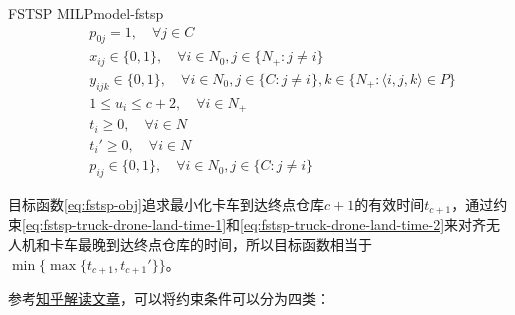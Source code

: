{\begin{model}{FSTSP MILP}{model-fstsp}
\begin{align}
    \quad & p_{0j} = 1, \quad \forall j \in C\label{eq:fstsp-drone-start-order}\\
    \quad & x_{ij} \in \{0, 1\}, \quad \forall i \in N_0, j \in \{N_{+}:j \neq i\}\label{eq:fstsp-x-bound}\\
    \quad & y_{ijk} \in \{0, 1\}, \quad \forall i \in N_0, j \in \{C:j \neq i\}, k \in \{N_{+}:\langle i,j,k \rangle \in P\}\label{eq:fstsp-y-bound}\\
    \quad & 1 \leq u_i \leq c+2, \quad \forall i \in N_{+}\label{eq:fstsp-u-bound}\\
    \quad & t_i \geq 0, \quad \forall i \in N\label{eq:fstsp-truck-time-bound}\\
    \quad & t_i' \geq 0, \quad \forall i \in N\label{eq:fstsp-drone-time-bound}\\
    \quad & p_{ij}\in \{0, 1\}, \quad \forall i \in N_0, j \in \{C: j \neq i\}\label{eq:fstsp-drone-order-bound}
\end{align}
\end{model}
}

目标函数\ref{eq:fstsp-obj}追求最小化卡车到达终点仓库$c+1$的有效时间$t_{c+1}$，通过约束\ref{eq:fstsp-truck-drone-land-time-1}和\ref{eq:fstsp-truck-drone-land-time-2}来对齐无人机和卡车最晚到达终点仓库的时间，所以目标函数相当于$\min\{\max\{t_{c+1},t_{c+1}'\}\}$。

参考\href{https://zhuanlan.zhihu.com/p/3235861366}{知乎解读文章}，可以将约束条件可以分为四类：

